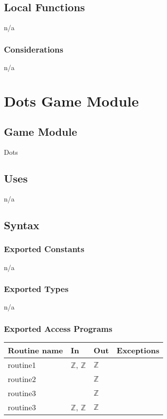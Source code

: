 \documentclass[12pt]{article}
\begin{document}
\subsection*{Local Functions}
n/a


\subsubsection* {Considerations}
n/a



\newpage
\section* {Dots Game Module}
\subsection*{Game Module}
Dots


\subsection* {Uses}
n/a


\subsection* {Syntax}
\subsubsection* {Exported Constants}
n/a

\subsubsection* {Exported Types}
n/a

\subsubsection* {Exported Access Programs}
\begin{tabular}{| l | l | l | l |}
\hline
\textbf{Routine name} & \textbf{In} & \textbf{Out} & \textbf{Exceptions}\\
\hline
routine1 & $\mathbb{Z}$, $\mathbb{Z}$ & $\mathbb{Z}$ & \\
\hline
routine2 & ~ & $\mathbb{Z}$ & ~\\
\hline
routine3 & ~ & $\mathbb{Z}$ & ~\\
\hline
routine3 & $\mathbb{Z}$, $\mathbb{Z}$ & $\mathbb{Z}$ & ~\\
\hline
\end{tabular}
\end{document}
